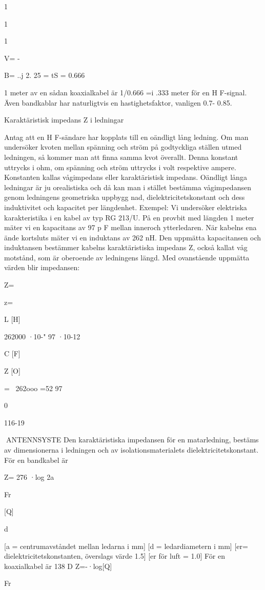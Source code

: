 \documentclass[a4paper,twoside,twocolumn,openright]{book}
\begin{document}
{{{{1

1

1

V= -{B= ..j 2. 25 = tS = 0.666

1 meter av en sådan koaxialkabel är
1/0.666 =i .333 meter för en H F-signal.
Även bandkablar har naturligtvis en
hastighetsfaktor, vanligen 0.7- 0.85.

Karaktäristisk impedans Z i ledningar

Antag att en H F-sändare har kopplats till en
oändligt lång ledning. Om man undersöker
kvoten mellan spänning och ström på godtyckliga ställen utmed ledningen, så kommer man att finna samma kvot överallt.
Denna konstant uttrycks i ohm, om spänning och ström uttrycks i volt respektive
ampere. Konstanten kallas vågimpedans
eller karaktäristisk impedans.
Oändligt långa ledningar är ju orealistiska och då kan man i stället bestämma vågimpedansen genom ledningens geometriska uppbygg nad, dielektricitetskonstant
och dess induktivitet och kapacitet per längdenhet.
Exempel:
Vi undersöker elektriska karakteristika i
en kabel av typ RG 213/U.
På en provbit med längden 1 meter mäter vi en kapacitans av 97 p F mellan inneroch ytterledaren. När kabelns ena ände
kortsluts mäter vi en induktans av 262 nH.
Den uppmätta kapacitansen och induktansen bestämmer kabelns karaktäristiska
impedans Z, också kallat våg motstånd, som
är oberoende av ledningens längd.
Med ovanstående uppmätta värden blir
impedansen:

Z=\ 

z=

L [H]

262000 ·10-"
97 ·10-12

C [F]

Z [O]

=~ 262ooo =52
97

0

116-19

ANTENNSYSTE
Den karaktäristiska impedansen för en
matarledning, bestäms av dimensionerna i
ledningen och av isolationsmaterialets dielektricitetskonstant.
För en bandkabel är

Z= 276 ·log 2a

Fr

[Q]

d

[a = centrumavståndet mellan ledarna i
mm]
[d = ledardiametern i mm]
[er= dielektricitetskonstanten, överslags
värde 1.5]
[er för luft = 1.0]
För en koaxialkabel är
138
D
Z=-·log[Q]

Fr

}}}}}
\end{document}
